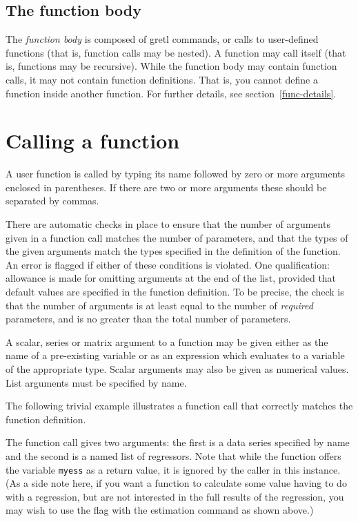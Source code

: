 \subsection{The function body}
   
The \textsl{function body} is composed of gretl commands, or
calls to user-defined functions (that is, function calls may be
nested).  A function may call itself (that is, functions may be
recursive). While the function body may contain function calls, it may
not contain function definitions.  That is, you cannot define a
function inside another function.  For further details, see
section~\ref{func-details}.


\section{Calling a function}
\label{func-call}

A user function is called by typing its name followed by zero or more
arguments enclosed in parentheses.  If there are two or more arguments
these should be separated by commas.  

There are automatic checks in place to ensure that the number of
arguments given in a function call matches the number of parameters,
and that the types of the given arguments match the types specified in
the definition of the function.  An error is flagged if either of
these conditions is violated.  One qualification: allowance is made
for omitting arguments at the end of the list, provided that default
values are specified in the function definition.  To be precise, the
check is that the number of arguments is at least equal to the number
of \textit{required} parameters, and is no greater than the total
number of parameters.

A scalar, series or matrix argument to a function may be given either
as the name of a pre-existing variable or as an expression which
evaluates to a variable of the appropriate type.  Scalar arguments may
also be given as numerical values.  List arguments must be specified
by name.

The following trivial example illustrates a function call that
correctly matches the function definition.
    
The function call gives two arguments: the first is a data series
specified by name and the second is a named list of regressors.  Note
that while the function offers the variable \verb+myess+ as a return
value, it is ignored by the caller in this instance.  (As a side note
here, if you want a function to calculate some value having to do with
a regression, but are not interested in the full results of the
regression, you may wish to use the  flag with the
estimation command as shown above.)
    
